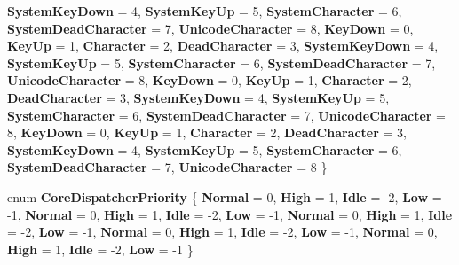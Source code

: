 \begin{DoxyCompactItemize}
{\bfseries System\+Key\+Down} = 4, 
{\bfseries System\+Key\+Up} = 5, 
{\bfseries System\+Character} = 6, 
\newline
{\bfseries System\+Dead\+Character} = 7, 
{\bfseries Unicode\+Character} = 8, 
{\bfseries Key\+Down} = 0, 
{\bfseries Key\+Up} = 1, 
\newline
{\bfseries Character} = 2, 
{\bfseries Dead\+Character} = 3, 
{\bfseries System\+Key\+Down} = 4, 
{\bfseries System\+Key\+Up} = 5, 
\newline
{\bfseries System\+Character} = 6, 
{\bfseries System\+Dead\+Character} = 7, 
{\bfseries Unicode\+Character} = 8, 
{\bfseries Key\+Down} = 0, 
\newline
{\bfseries Key\+Up} = 1, 
{\bfseries Character} = 2, 
{\bfseries Dead\+Character} = 3, 
{\bfseries System\+Key\+Down} = 4, 
\newline
{\bfseries System\+Key\+Up} = 5, 
{\bfseries System\+Character} = 6, 
{\bfseries System\+Dead\+Character} = 7, 
{\bfseries Unicode\+Character} = 8, 
\newline
{\bfseries Key\+Down} = 0, 
{\bfseries Key\+Up} = 1, 
{\bfseries Character} = 2, 
{\bfseries Dead\+Character} = 3, 
\newline
{\bfseries System\+Key\+Down} = 4, 
{\bfseries System\+Key\+Up} = 5, 
{\bfseries System\+Character} = 6, 
{\bfseries System\+Dead\+Character} = 7, 
\newline
{\bfseries Unicode\+Character} = 8
 \}
\item 
\mbox{\label{namespace_windows_1_1_u_i_1_1_core_a612646cf897e13d073df58cbf255fea7}} 
enum {\bfseries Core\+Dispatcher\+Priority} \{ \newline
{\bfseries Normal} = 0, 
{\bfseries High} = 1, 
{\bfseries Idle} = -\/2, 
{\bfseries Low} = -\/1, 
\newline
{\bfseries Normal} = 0, 
{\bfseries High} = 1, 
{\bfseries Idle} = -\/2, 
{\bfseries Low} = -\/1, 
\newline
{\bfseries Normal} = 0, 
{\bfseries High} = 1, 
{\bfseries Idle} = -\/2, 
{\bfseries Low} = -\/1, 
\newline
{\bfseries Normal} = 0, 
{\bfseries High} = 1, 
{\bfseries Idle} = -\/2, 
{\bfseries Low} = -\/1, 
\newline
{\bfseries Normal} = 0, 
{\bfseries High} = 1, 
{\bfseries Idle} = -\/2, 
{\bfseries Low} = -\/1
 \}
\item 
\mbox{\label{namespace_windows_1_1_u_i_1_1_core_aa71ac02d1eeaccb86184a016581721ab}} 

\end{DoxyCompactItemize}
